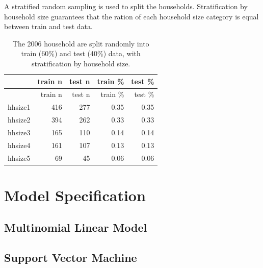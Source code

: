 \documentclass[]{article}
\newenvironment{Shaded}{\begin{snugshade}}{\end{snugshade}}
\newcommand{\DataTypeTok}[1]{\textcolor[rgb]{0.13,0.29,0.53}{#1}}
\newcommand{\DecValTok}[1]{\textcolor[rgb]{0.00,0.00,0.81}{#1}}
\newcommand{\KeywordTok}[1]{\textcolor[rgb]{0.13,0.29,0.53}{\textbf{#1}}}
\newcommand{\NormalTok}[1]{#1}
\newcommand{\OperatorTok}[1]{\textcolor[rgb]{0.81,0.36,0.00}{\textbf{#1}}}
\newcommand{\OtherTok}[1]{\textcolor[rgb]{0.56,0.35,0.01}{#1}}
\newcommand{\StringTok}[1]{\textcolor[rgb]{0.31,0.60,0.02}{#1}}
\begin{document}
A stratified random sampling is used to split the households.
Stratification by household size guarantees that the ration of each
household size category is equal between train and test data.

\begin{longtable}[]{@{}lrrrr@{}}
\caption{\label{tab:tab6} The 2006 household are split randomly into
train (60\%) and test (40\%) data, with stratification by household
size.}\tabularnewline
\toprule
& train n & test n & train \% & test \%\tabularnewline
\midrule
\endfirsthead
\toprule
& train n & test n & train \% & test \%\tabularnewline
\midrule
\endhead
hhsize1 & 416 & 277 & 0.35 & 0.35\tabularnewline
hhsize2 & 394 & 262 & 0.33 & 0.33\tabularnewline
hhsize3 & 165 & 110 & 0.14 & 0.14\tabularnewline
hhsize4 & 161 & 107 & 0.13 & 0.13\tabularnewline
hhsize5 & 69 & 45 & 0.06 & 0.06\tabularnewline
\bottomrule
\end{longtable}

\hypertarget{model-specification}{%
\section{Model Specification}\label{model-specification}}

\hypertarget{multinomial-linear-model}{%
\subsection{Multinomial Linear Model}\label{multinomial-linear-model}}

\begin{Shaded}
\end{Shaded}

\hypertarget{support-vector-machine}{%
\subsection{Support Vector Machine}\label{support-vector-machine}}
\end{document}
